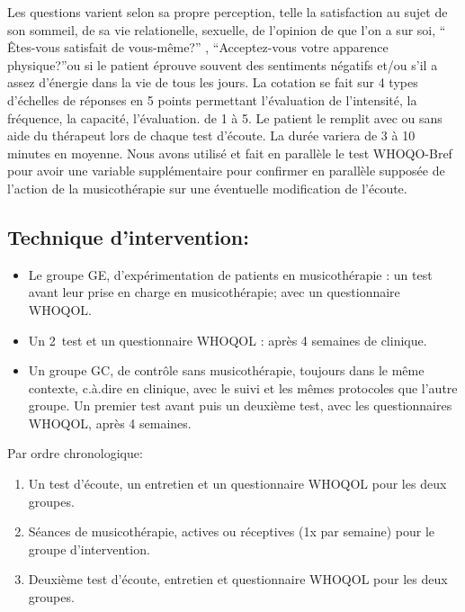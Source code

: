 Les questions varient selon sa propre perception, telle la satisfaction
au sujet de son  sommeil, de sa vie relationelle, sexuelle, de
l'opinion de que l'on a sur soi,  `` Êtes-vous satisfait de
vous-même?'' , ``Acceptez-vous votre apparence physique?''ou si le patient éprouve souvent des sentiments négatifs
et/ou s'il a assez d'énergie dans la vie de tous les jours.
La cotation se fait sur 4 types d'échelles de réponses en 5 points
permettant l'évaluation de l'intensité, la fréquence, la capacité, l'évaluation.
de 1 à 5.
Le patient le remplit avec ou sans aide du
thérapeut lors de chaque test
d'écoute. La durée variera de 3 à 10 minutes en
moyenne. 
Nous avons utilisé et fait en parallèle le test WHOQO-Bref pour avoir une variable supplémentaire pour confirmer en
parallèle supposée de l'action de la musicothérapie sur une éventuelle modification de l'écoute.


        	
        \subsection{Technique d'intervention:}


       
\begin{itemize}
	\item Le groupe GE, d'expérimentation de patients en musicothérapie : un
          test avant leur prise en charge en musicothérapie; avec un questionnaire
          WHOQOL.
          
          \item Un 2\ieme\ test et un questionnaire WHOQOL : après 4 semaines de
          clinique.
          
	\item Un groupe GC, de contrôle sans musicothérapie,
	toujours dans le même contexte, c.à.dire en clinique, avec le suivi et les mêmes protocoles que l'autre groupe. Un premier test avant
 puis un deuxième test, avec les questionnaires WHOQOL, après 4 semaines. 
\end{itemize}

 Par ordre chronologique:
 
\begin{enumerate} 
        \item Un test d'écoute, un entretien et un questionnaire
          WHOQOL pour les deux groupes.
        \item Séances de musicothérapie, actives ou réceptives (1x par
          semaine) pour le groupe d'intervention.
        \item Deuxième test d'écoute, entretien et questionnaire
          WHOQOL pour les deux groupes.
\end{enumerate}

